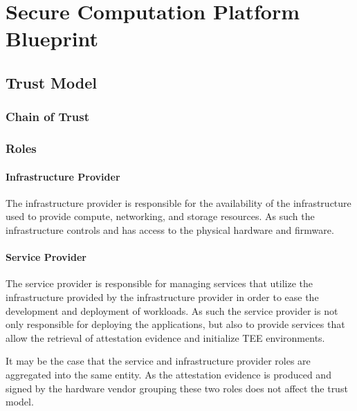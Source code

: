 
\chapter{Secure Computation Platform Blueprint}
\label{ch:proposal}

\section{Trust Model}
\label{sec:trust-model}


\subsection{Chain of Trust}

\subsection{Roles}

\subsubsection*{Infrastructure Provider}

The infrastructure provider is responsible for the availability of the
infrastructure used to provide compute, networking, and storage resources. As
such the infrastructure controls and has access to the physical hardware and
firmware.

\subsubsection*{Service Provider}

The service provider is responsible for managing services that utilize the
infrastructure provided by the infrastructure provider in order to ease the
development and deployment of workloads. As such the service provider is not
only responsible for deploying the applications, but also to provide services
that allow the retrieval of attestation evidence and initialize TEE
environments.

It may be the case that the service and infrastructure provider roles are
aggregated into the same entity. As the attestation evidence is produced and
signed by the hardware vendor grouping these two roles does not affect the trust
model.

